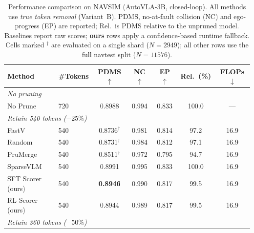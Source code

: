\newcommand{\shard}{$^{\dagger}$}   %
\newcommand{\best}[1]{\textbf{#1}}

\begin{table}[t]
\centering
\caption{Performance comparison on NAVSIM (AutoVLA-3B, closed-loop).
All methods use \emph{true token removal} (Variant~B). PDMS, no-at-fault collision
(NC) and ego-progress (EP) are reported; Rel.\ is PDMS relative to the unpruned model.
Baselines report raw scores; \textbf{ours} rows apply a confidence-based runtime
fallback. Cells marked \shard{} are evaluated on a single shard ($N{=}2949$); all other
rows use the full navtest split ($N{=}11576$).}
\label{tab:main}
\small
\setlength{\tabcolsep}{6pt}
\begin{tabular}{llccccc}
\toprule
Method & \#Tokens & PDMS $\uparrow$ & NC $\uparrow$ & EP $\uparrow$ & Rel.\ (\%) & FLOPs $\downarrow$ \\
\midrule
\multicolumn{7}{l}{\emph{No pruning}} \\
No Prune & 720 & 0.8988 & 0.994 & 0.833 & 100.0 & --- \\
\midrule
\multicolumn{7}{l}{\emph{Retain 540 tokens ($-25\%$)}} \\
FastV      & 540 & 0.8736\shard & 0.981 & 0.814 & 97.2 & 16.9 \\
Random     & 540 & 0.8731\shard & 0.984 & 0.812 & 97.1 & 16.9 \\
PruMerge   & 540 & 0.8511\shard & 0.972 & 0.795 & 94.7 & 16.9 \\
SparseVLM  & 540 & 0.8991 & 0.995 & 0.833 & 100.0 & 16.9 \\
SFT Scorer (ours) & 540 & \best{0.8946} & 0.990 & 0.817 & 99.5 & 16.9 \\
RL Scorer (ours)  & 540 & 0.8944 & 0.989 & 0.817 & 99.5 & 16.9 \\
\midrule
\multicolumn{7}{l}{\emph{Retain 360 tokens ($-50\%$)}} \\

\end{tabular}
\end{table}
